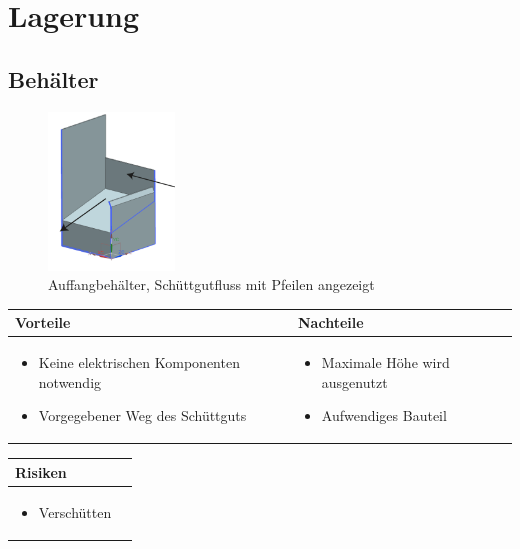
\section{Lagerung}


\subsection{Behälter}

\begin{figure} [hbp]
	\centering
	\includegraphics[width=0.3\textwidth]{fig/Unbenannt-1.png}
	\caption{Auffangbehälter, Schüttgutfluss mit Pfeilen angezeigt}
\end{figure}

\begin{table}[h]
\begin{tabular}{p{} | p{}}


 \textbf{Vorteile} & \textbf{Nachteile} \\ \hline
	 
\begin{itemize}
\item Keine elektrischen Komponenten notwendig
\item Vorgegebener Weg des Schüttguts
\end{itemize}

 
 &
 
\begin{itemize}
\item Maximale Höhe wird ausgenutzt
\item Aufwendiges Bauteil
\end{itemize}

\end{tabular}
\end{table}

\begin{table}[h]
\begin{tabular}{p{}p{}}


 \textbf{Risiken} & \\ \hline
	 
\begin{itemize}
\item Verschütten
\end{itemize}

 
\end{tabular}
\end{table}

\pagebreak

